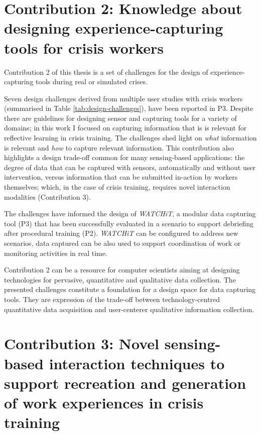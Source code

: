 \section{Contribution 2: Knowledge about designing experience-capturing tools for crisis workers}\label{c2-knowledge-about-designing-experience-capturing-tools-for-crisis-workers}

Contribution 2 of this thesis is a set of challenges for the design of experience-capturing tools during real or simulated crises.

Seven design challenges derived from multiple user studies with crisis workers (summarised in Table \ref{tab:design-challenges}), have been reported in P3. Despite there are guidelines for designing sensor and capturing tools for a variety of domains; in this work I focused on capturing information that is is relevant for reflective learning in crisis training. The challenges shed light on \emph{what} information is relevant and \emph{how} to capture relevant information. This contribution also highlights a design trade-off common for many sensing-based applications: the degree of data that can be captured with sensors, automatically and without user intervention, versus information that can be submitted in-action by workers themselves; which, in the case of crisis training, requires novel interaction modalities (Contribution 3). 

The challenges have informed the design of \emph{WATCHiT}, a modular data capturing tool (P3) that has been successfully evaluated in a scenario to support debriefing after procedural training (P2). \emph{WATCHiT} can be configured to address new scenarios, data captured can be also used to support coordination of work or monitoring activities in real time.

Contribution 2 can be a resource for computer scientists aiming at designing technologies for pervasive, quantitative and qualitative data collection. The presented challenges constitute a foundation for a design space for data capturing tools. They are expression of the trade-off between technology-centred quantitative data acquisition and user-centerer qualitative information collection.

\section{Contribution 3: Novel sensing-based interaction techniques to support recreation and generation of work experiences in crisis training}\label{c3-novel-sensing-based-interaction-techniques-to-support-recreation-and-generation-of-work-experiences-in-crisis-training}

